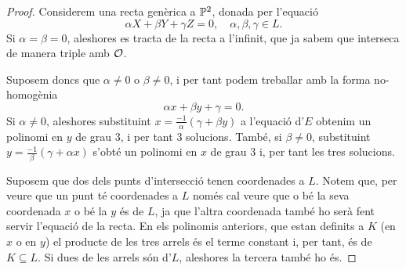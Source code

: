 \begin{proof}
Considerem una recta genèrica a $\P^2$, donada per l'equació
\[
\alpha X+\beta Y+\gamma Z=0, \quad \alpha,\beta,\gamma\in L.
\]
Si $\alpha=\beta=0$, aleshores es tracta de la recta a l'infinit, que ja sabem que interseca de manera triple amb $\calO$.

Suposem doncs que $\alpha\neq 0$ o $\beta\neq 0$, i per tant podem treballar amb la forma no-homogènia
\[
\alpha x + \beta y + \gamma = 0.
\]
Si $\alpha \neq 0$, aleshores substituint $x = \frac{-1}{\alpha} (\gamma + \beta y)$ a l'equació d'$E$ obtenim un polinomi en $y$ de grau $3$, i per tant $3$ solucions. També, si $\beta\neq 0$, substituint $y=\frac{-1}{\beta}(\gamma + \alpha x)$ s'obté un polinomi en $x$ de grau $3$ i, per tant les tres solucions.

Suposem que dos dels punts d'intersecció tenen coordenades a $L$. Notem que, per veure que un punt té coordenades a $L$ només cal veure que o bé la seva coordenada $x$ o bé la $y$ és de $L$, ja que l'altra coordenada també ho serà fent servir l'equació de la recta. En els polinomis anteriors, que estan definits a $K$ (en $x$ o en $y$) el producte de les tres arrels és el terme constant i, per tant, és de $K\subseteq L$. Si dues de les arrels són d'$L$, aleshores la tercera també ho és.

\end{proof}


